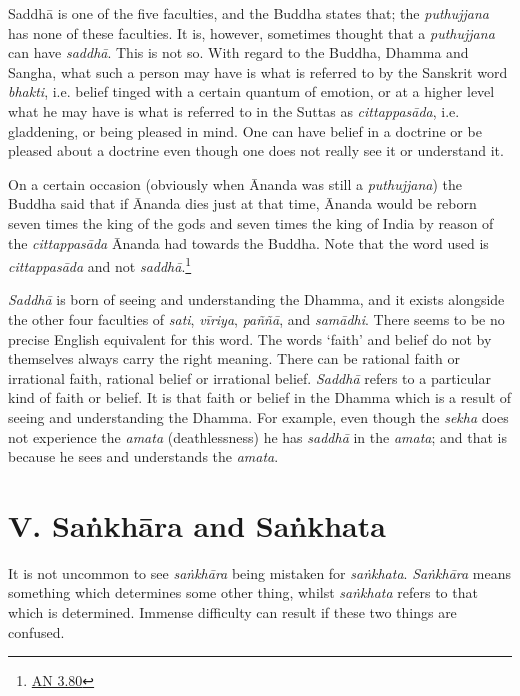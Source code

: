 Saddhā is one of the five faculties, and the Buddha states that; the \textit{puthujjana} has none of these faculties. It is, however, sometimes thought that a \textit{puthujjana} can have \textit{saddhā}. This is not so. With regard to the Buddha, Dhamma and Sangha, what such a person may have is what is referred to by the Sanskrit word \textit{bhakti}, i.e. belief tinged with a certain quantum of emotion, or at a higher level what he may have is what is referred to in the Suttas as \textit{cittappasāda}, i.e. gladdening, or being pleased in mind. One can have belief in a doctrine or be pleased about a doctrine even though one does not really see it or understand it.

On a certain occasion (obviously when Ānanda was still a \textit{puthujjana}) the Buddha said that if Ānanda dies just at that time, Ānanda would be reborn seven times the king of the gods and seven times the king of India by reason of the \textit{cittappasāda} Ānanda had towards the Buddha. Note that the word used is \textit{cittappasāda} and not \textit{saddhā}.\footnote{\href{https://suttacentral.net/an3.80/en/sujato}{AN 3.80}}

\textit{Saddhā} is born of seeing and understanding the Dhamma, and it exists alongside the other four faculties of \textit{sati}, \textit{vīriya}, \textit{paññā}, and \textit{samādhi}. There seems to be no precise English equivalent for this word. The words `faith' and belief do not by themselves always carry the right meaning. There can be rational faith or irrational faith, rational belief or irrational belief. \textit{Saddhā} refers to a particular kind of faith or belief. It is that faith or belief in the Dhamma which is a result of seeing and understanding the Dhamma. For example, even though the \textit{sekha} does not experience the \textit{amata} (deathlessness) he has \textit{saddhā} in the \textit{amata}; and that is because he sees and understands the \textit{amata}.

\hypertarget{_v_saux1e45khux101ra_and_saux1e45khata}{%
\section{V. Saṅkhāra and Saṅkhata}\label{_v_saux1e45khux101ra_and_saux1e45khata}}

It is not uncommon to see \textit{saṅkhāra} being mistaken for \textit{saṅkhata}. \textit{Saṅkhāra} means something which determines some other thing, whilst \textit{saṅkhata} refers to that which is determined. Immense difficulty can result if these two things are confused.


